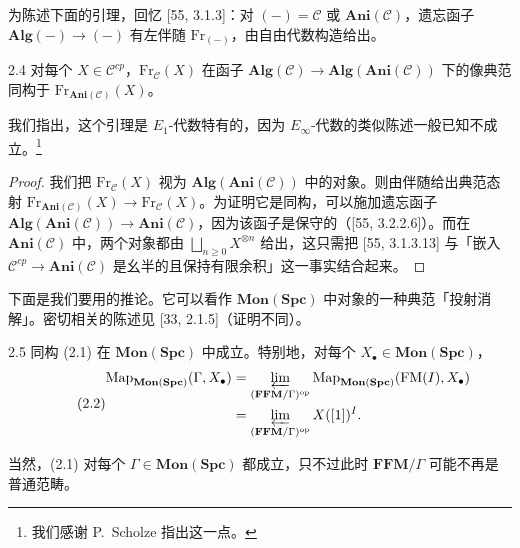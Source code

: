 为陈述下面的引理，回忆 [55, 3.1.3]：对 $(-)=\mathcal C$ 或 $\mathbf{Ani}(\mathcal C)$，遗忘函子 $\mathbf{Alg}(-)\to(-)$ 有左伴随 $\mathrm{Fr}_{(-)}$，由自由代数构造给出。

\begin{lem}{2.4}\label{lem:a2-2-4}
对每个 $X\in\mathcal C^{cp}$，$\mathrm{Fr}_{\mathcal C}(X)$ 在函子 $\mathbf{Alg}(\mathcal C)\to\mathbf{Alg}(\mathbf{Ani}(\mathcal C))$ 下的像典范同构于 $\mathrm{Fr}_{\mathbf{Ani}(\mathcal C)}(X)$。
\end{lem}

我们指出，这个引理是 $E_1$-代数特有的，因为 $E_\infty$-代数的类似陈述一般已知不成立。\footnote{我们感谢 P.~Scholze 指出这一点。}

\begin{proof}
我们把 $\mathrm{Fr}_{\mathcal C}(X)$ 视为 $\mathbf{Alg}(\mathbf{Ani}(\mathcal C))$ 中的对象。则由伴随给出典范态射 $\mathrm{Fr}_{\mathbf{Ani}(\mathcal C)}(X)\to\mathrm{Fr}_{\mathcal C}(X)$。为证明它是同构，可以施加遗忘函子 $\mathbf{Alg}(\mathbf{Ani}(\mathcal C))\to\mathbf{Ani}(\mathcal C)$，因为该函子是保守的（[55, 3.2.2.6]）。而在 $\mathbf{Ani}(\mathcal C)$ 中，两个对象都由 $\bigsqcup_{n\ge 0}X^{\otimes n}$ 给出，这只需把 [55, 3.1.3.13] 与「嵌入 $\mathcal C^{cp}\to\mathbf{Ani}(\mathcal C)$ 是幺半的且保持有限余积」这一事实结合起来。
\end{proof}

下面是我们要用的推论。它可以看作 $\mathbf{Mon}(\mathbf{Spc})$ 中对象的一种典范「投射消解」。密切相关的陈述见 [33, 2.1.5]（证明不同）。

\begin{cor}{2.5}\label{cor:a2-2-5}
同构 (2.1) 在 $\mathbf{Mon}(\mathbf{Spc})$ 中成立。特别地，对每个 $X_\bullet\in\mathbf{Mon}(\mathbf{Spc})$，
\begin{equation}\tag{2.2}
\begin{aligned}
\operatorname{Map}_{\mathbf{Mon}(\mathbf{Spc})}(\Gamma,X_\bullet)
&=\varprojlim_{(\mathbf{FFM}/\Gamma)^{\mathrm{op}}}\operatorname{Map}_{\mathbf{Mon}(\mathbf{Spc})}(\mathrm{FM}(I),X_\bullet)\\
&=\varprojlim_{(\mathbf{FFM}/\Gamma)^{\mathrm{op}}}X([1])^I .
\end{aligned}
\end{equation}
\end{cor}

当然，(2.1) 对每个 $\Gamma\in\mathbf{Mon}(\mathbf{Spc})$ 都成立，只不过此时 $\mathbf{FFM}/\Gamma$ 可能不再是普通范畴。

